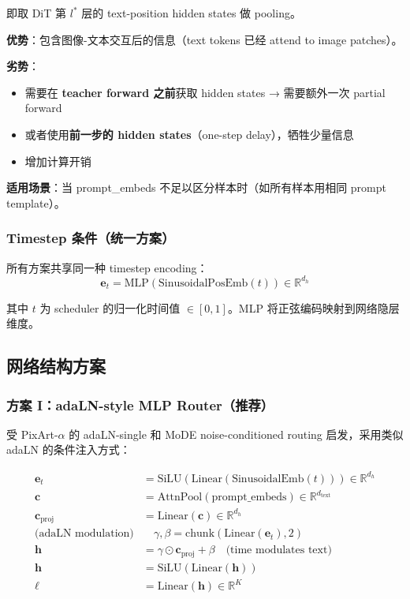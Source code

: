 \documentclass[11pt,a4paper]{article}
\newcommand{\R}{\mathbb{R}}
\theoremstyle{definition}
\begin{document}
即取 DiT 第 $l^*$ 层的 text-position hidden states 做 pooling。

\textbf{优势}：包含图像-文本交互后的信息（text tokens 已经 attend to image patches）。

\textbf{劣势}：
\begin{itemize}
    \item 需要在 \textbf{teacher forward 之前}获取 hidden states → 需要额外一次 partial forward
    \item 或者使用\textbf{前一步的 hidden states}（one-step delay），牺牲少量信息
    \item 增加计算开销
\end{itemize}

\textbf{适用场景}：当 prompt\_embeds 不足以区分样本时（如所有样本用相同 prompt template）。

\subsubsection{Timestep 条件（统一方案）}

所有方案共享同一种 timestep encoding：
\begin{equation}
\mathbf{e}_t = \text{MLP}(\text{SinusoidalPosEmb}(t)) \in \R^{d_h}
\end{equation}

其中 $t$ 为 scheduler 的归一化时间值 $\in [0, 1]$。MLP 将正弦编码映射到网络隐层维度。

\subsection{网络结构方案}

\subsubsection{方案 I：adaLN-style MLP Router（\textbf{推荐}）}

受 PixArt-$\alpha$ 的 adaLN-single 和 MoDE noise-conditioned routing 启发，采用类似 adaLN 的条件注入方式：

\begin{align}
\mathbf{e}_t &= \text{SiLU}(\text{Linear}(\text{SinusoidalEmb}(t))) \in \R^{d_h} \\
\mathbf{c} &= \text{AttnPool}(\text{prompt\_embeds}) \in \R^{d_{\text{text}}} \\
\mathbf{c}_{\text{proj}} &= \text{Linear}(\mathbf{c}) \in \R^{d_h} \\[0.5em]
\text{(adaLN modulation)} &\quad \gamma, \beta = \text{chunk}(\text{Linear}(\mathbf{e}_t), 2) \\
\mathbf{h} &= \gamma \odot \mathbf{c}_{\text{proj}} + \beta \quad \text{(time modulates text)} \\
\mathbf{h} &= \text{SiLU}(\text{Linear}(\mathbf{h})) \\
\bm{\ell} &= \text{Linear}(\mathbf{h}) \in \R^K
\end{align}
\end{document}
